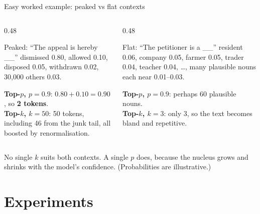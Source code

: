 \documentclass[aspectratio=169,11pt]{beamer}
\begin{document}
\begin{frame}{Easy worked example: peaked vs flat contexts}
  \begin{columns}[T]
    \begin{column}{0.48\textwidth}
      \begin{exampleblock}{Peaked: ``The appeal is hereby \_\_''}
        \small
        dismissed 0.80, allowed 0.10, disposed 0.05, withdrawn 0.02, 30,000 others 0.03.
        \vspace{1mm}

        \textbf{Top-$p$, $p=0.9$}: $0.80+0.10=0.90$, so \textbf{2 tokens}.\\
        \textbf{Top-$k$, $k=50$}: 50 tokens, including 46 from the junk tail, all boosted by renormalisation.
      \end{exampleblock}
    \end{column}
    \begin{column}{0.48\textwidth}
      \begin{exampleblock}{Flat: ``The petitioner is a \_\_''}
        \small
        resident 0.06, company 0.05, farmer 0.05, trader 0.04, teacher 0.04, \ldots, many plausible nouns each near 0.01--0.03.
        \vspace{1mm}

        \textbf{Top-$p$, $p=0.9$}: perhaps 60 plausible nouns.\\
        \textbf{Top-$k$, $k=3$}: only 3, so the text becomes bland and repetitive.
      \end{exampleblock}
    \end{column}
  \end{columns}
  \vspace{2mm}
  \small
  No single $k$ suits both contexts. A single $p$ does, because the nucleus grows and shrinks with the model's confidence. {\scriptsize (Probabilities are illustrative.)}
\end{frame}

\section{Experiments}
\end{document}
